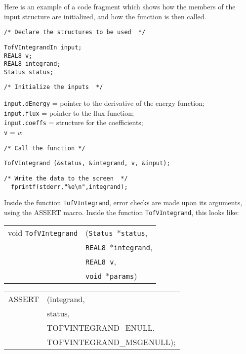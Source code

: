 \documentclass[12pt]{article}
\begin{document}
Here is an example of a code fragment which shows how the members of the input structure are initialized, and how the function is then called.

\vspace{5mm}

\noindent
\begin{verbatim}
/* Declare the structures to be used  */
\end{verbatim}
\texttt{TofVIntegrandIn input;} \\
\texttt{REAL8 v;} \\
\texttt{REAL8 integrand;} \\
\texttt{Status status;} \\
\begin{verbatim}
/* Initialize the inputs  */
\end{verbatim}
\texttt{input.dEnergy} = pointer to the derivative of the energy function; \\
\texttt{input.flux} = pointer to the flux function; \\
\texttt{input.coeffs} = structure for the coefficients; \\
\texttt{v} = $v$;
\begin{verbatim}
/* Call the function */
\end{verbatim}
\texttt{TofVIntegrand (\&status, \&integrand, v, \&input);}
\begin{verbatim}
/* Write the data to the screen  */
  fprintf(stderr,"%e\n",integrand); 
\end{verbatim}

Inside the function \texttt{TofVIntegrand}, error checks are made upon its arguments, using the ASSERT macro. Inside the function \texttt{TofVIntegrand}, this looks like:

\vspace{5mm}

\begin{tabular}{ll}
void \texttt{TofVIntegrand}&(\texttt{Status $\ast$status},     \\
                                   &\texttt{REAL8 $\ast$integrand}, \\
                                   &\texttt{REAL8 v}, \\
                                   &\texttt{void $\ast$params})
\end{tabular}

\vspace{5mm}

\begin{tabular}{ll}
ASSERT & (integrand,  \\
       &  status,    \\
       &  TOFVINTEGRAND\_ENULL, \\
       &  TOFVINTEGRAND\_MSGENULL);
\end{tabular}
\end{document}
